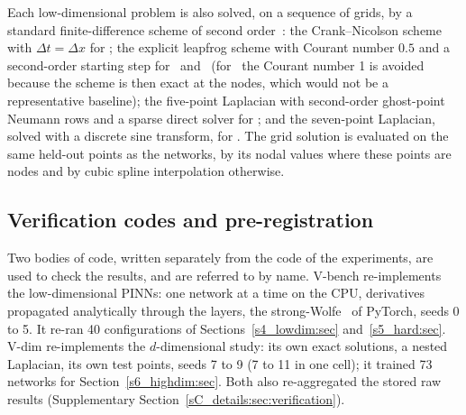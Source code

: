 Each low-dimensional problem is also solved, on a sequence of grids, by a standard
finite-difference scheme of second order~\citep{leveque2007}: the Crank--Nicolson
scheme~\citep{crank1947} with $\Delta t=\Delta x$ for \PH; the explicit leapfrog scheme
with Courant number $0.5$ and a second-order starting step for \PWone\ and \PWtwo\ (for
\PWone\ the Courant number 1 is avoided because the scheme is then exact at the nodes,
which would not be a representative baseline); the five-point Laplacian with second-order
ghost-point Neumann rows and a sparse direct solver for \PLtwo; and the seven-point
Laplacian, solved with a discrete sine transform, for \PLthree. The grid solution is
evaluated on the same held-out points as the networks, by its nodal values where these
points are nodes and by cubic spline interpolation otherwise.

\subsection{Verification codes and pre-registration}\label{s3_methods:sec:verif}

Two bodies of code, written separately from the code of the experiments, are used to check
the results, and are referred to by name.
\textsf{V-bench} re-implements the low-dimensional PINNs: one network at a time on the
CPU, derivatives propagated analytically through the layers, the strong-Wolfe \LBFGS\ of
PyTorch, seeds 0 to 5. It re-ran 40 configurations of
Sections~\ref{s4_lowdim:sec} and~\ref{s5_hard:sec}. \textsf{V-dim} re-implements the
$d$-dimensional study: its own exact solutions, a nested Laplacian, its own test points,
seeds 7 to 9 (7 to 11 in one cell); it trained 73 networks for Section~\ref{s6_highdim:sec}.
Both also re-aggregated the stored raw results (Supplementary
Section~\ref{sC_details:sec:verification}).

